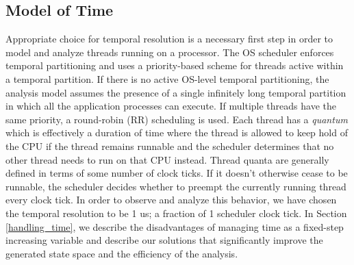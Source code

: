 \subsection{Model of Time}
\label{sec:model_of_time}

Appropriate choice for temporal resolution is a necessary first step in order to model and analyze threads running on a processor. The OS scheduler enforces temporal partitioning and uses a priority-based scheme for threads active within a temporal partition. If there is no active OS-level temporal partitioning, the analysis model assumes the presence of a single infinitely long temporal partition in which all the application processes can execute. If multiple threads have the same priority, a round-robin (RR) scheduling is used. Each thread has a \emph{quantum} which is effectively a duration of time where the thread is allowed to keep hold of the CPU if the thread remains runnable and the scheduler determines that no other thread needs to run on that CPU instead. Thread quanta are generally defined in terms of some number of clock ticks. If it doesn't otherwise cease to be runnable, the scheduler decides whether to preempt the currently running thread every clock tick. In order to observe and analyze this behavior, we have chosen the temporal resolution to be 1 us; a fraction of 1 scheduler clock tick. In Section \ref{handling_time}, we describe the disadvantages of managing time as a fixed-step increasing variable and describe our solutions that significantly improve the generated state space and the efficiency of the analysis. 


